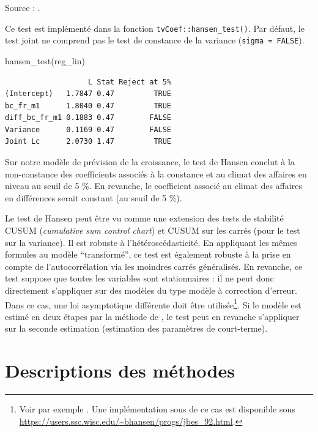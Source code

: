 \documentclass[
  a4paper,
  DIV=11,
  numbers=noendperiod,
  french]{scrartcl}
\newenvironment{Shaded}{\begin{snugshade}}{\end{snugshade}}
\newcommand{\FunctionTok}[1]{\textcolor[rgb]{0.28,0.35,0.67}{#1}}
\newcommand{\NormalTok}[1]{\textcolor[rgb]{0.00,0.23,0.31}{#1}}
\newcommand\1{{\mathds 1}}
\theoremstyle{remark}
\begin{document}
Source : \textcite{hansen1990lagrange}.

Ce test est implémenté dans la fonction \texttt{tvCoef::hansen\_test()}.
Par défaut, le test joint ne comprend pas le test de constance de la
variance (\texttt{sigma\ =\ FALSE}).

\begin{Shaded}
\begin{Highlighting}[]
\FunctionTok{hansen\_test}\NormalTok{(reg\_lin)}
\end{Highlighting}
\end{Shaded}

\begin{verbatim}
                   L Stat Reject at 5%
(Intercept)   1.7847 0.47         TRUE
bc_fr_m1      1.8040 0.47         TRUE
diff_bc_fr_m1 0.1883 0.47        FALSE
Variance      0.1169 0.47        FALSE
Joint Lc      2.0730 1.47         TRUE
\end{verbatim}

Sur notre modèle de prévision de la croissance, le test de Hansen
conclut à la non-constance des coefficients associés à la constance et
au climat des affaires en niveau au seuil de 5 \%. En revanche, le
coefficient associé au climat des affaires en différences serait
constant (au seuil de 5 \%).

Le test de Hansen peut être vu comme une extension des tests de
stabilité CUSUM (\emph{cumulative sum control chart}) et CUSUM sur les
carrés (pour le test sur la variance). Il est robuste à
l'hétéroscédasticité. En appliquant les mêmes formules au modèle
``transformé'', ce test est également robuste à la prise en compte de
l'autocorrélation via les moindres carrés généralisés. En revanche, ce
test suppose que toutes les variables sont stationnaires : il ne peut
donc directement s'appliquer sur des modèles du type modèle à correction
d'erreur. Dans ce cas, une loi asymptotique différente doit être
utilisée\footnote{ Voir par exemple \textcite{hansen1992I1}. Une
  implémentation sous  de ce cas est disponible sous
  \url{https://users.ssc.wisc.edu/~bhansen/progs/jbes_92.html}.}. Si le
modèle est estimé en deux étapes par la méthode de
\textcite{engle1987co}, le test peut en revanche s'appliquer sur la
seconde estimation (estimation des paramètres de court-terme).

\section{Descriptions des méthodes}\label{sec-desc-meth}
\end{document}
